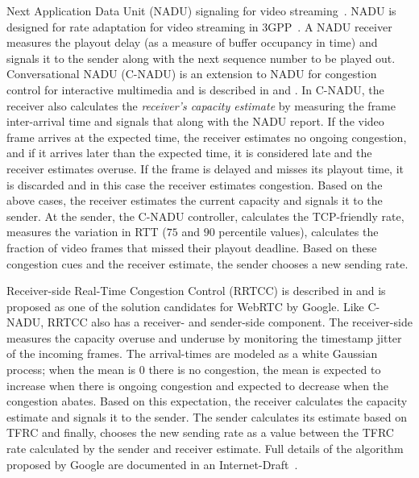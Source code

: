 Next Application Data Unit (NADU) signaling for video
streaming~\cite{nadu.1070341,nadu.1530486}. NADU is designed for rate
adaptation for video streaming in 3GPP~\cite{3gpp.26.234}. A NADU receiver
measures the playout delay (as a measure of buffer occupancy in time) and
signals it to the sender along with the next sequence number to be played out.
Conversational NADU (C-NADU) is an extension to NADU for congestion control
for interactive multimedia and is described in  and
. In C-NADU, the receiver also calculates the
\emph{receiver's capacity estimate} by measuring the frame inter-arrival time
and signals that along with the NADU report. If the video frame arrives at the
expected time, the receiver estimates no ongoing congestion, and if it arrives
later than the expected time, it is considered late and the receiver estimates
overuse. If the frame is delayed and misses its playout time, it is discarded
and in this case the receiver estimates congestion. Based on the above cases,
the receiver estimates the current capacity and signals it to the sender. At
the sender, the C-NADU controller, calculates the TCP-friendly rate, measures
the variation in RTT ($75$ and $90$ percentile values), calculates the
fraction of video frames that missed their playout deadline. Based on these
congestion cues and the receiver estimate, the sender chooses a new sending
rate.


Receiver-side Real-Time Congestion Control (RRTCC) is described in
\cite{draft.rrtcc} and is proposed as one of the solution candidates for
WebRTC by Google. Like C-NADU, RRTCC also has a receiver- and sender-side
component. The receiver-side measures the capacity overuse and underuse by
monitoring the timestamp jitter of the incoming frames. The arrival-times are
modeled as a white Gaussian process; when the mean is 0 there is no
congestion, the mean is expected to increase when there is ongoing congestion
and expected to decrease when the congestion abates. Based on this
expectation, the receiver calculates the capacity estimate and signals it to
the sender. The sender calculates its estimate based on TFRC and finally,
chooses the new sending rate as a value between the TFRC rate calculated by
the sender and receiver estimate. Full details of the algorithm proposed by
Google are documented in an Internet-Draft~\cite{draft.rrtcc}.



